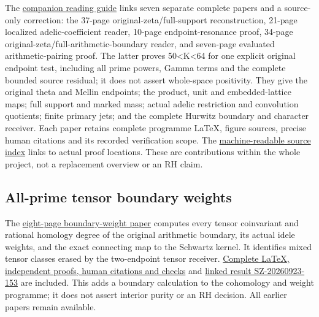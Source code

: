 \documentclass[
]{article}
\begin{document}
The
\href{https://github.com/KokunoYumeto/zeta-function-research-reader/blob/main/workbenches/splitzero-tandem/continuations/20260923-retained-source-readers/README.md}{companion
reading guide} links seven separate complete papers and a source-only
correction: the 37-page original-zeta/full-support reconstruction,
21-page localized adelic-coefficient reader, 10-page endpoint-resonance
proof, 34-page original-zeta/full-arithmetic-boundary reader, and
seven-page evaluated arithmetic-pairing proof. The latter proves
50\textless K\textless64 for one explicit original endpoint test,
including all prime powers, Gamma terms and the complete bounded source
residual; it does not assert whole-space positivity. They give the
original theta and Mellin endpoints; the product, unit and
embedded-lattice maps; full support and marked mass; actual adelic
restriction and convolution quotients; finite primary jets; and the
complete Hurwitz boundary and character receiver. Each paper retains
complete programme LaTeX, figure sources, precise human citations and
its recorded verification scope. The
\href{https://github.com/KokunoYumeto/zeta-function-research-reader/blob/main/workbenches/splitzero-tandem/continuations/20260923-retained-source-readers/PUBLIC_SOURCE_INDEX.json}{machine-readable
source index} links to actual proof locations. These are contributions
within the whole project, not a replacement overview or an RH claim.

\subsection{All-prime tensor boundary
weights}\label{all-prime-tensor-boundary-weights}

The
\href{https://github.com/KokunoYumeto/zeta-function-research-reader/blob/main/workbenches/splitzero-tandem/continuations/20260923-retained-source-readers/all-prime-boundary-weights/ROOT_BOUNDARY_WEIGHT_HOMOLOGY.pdf}{eight-page
boundary-weight paper} computes every tensor coinvariant and rational
homology degree of the original arithmetic boundary, its actual idele
weights, and the exact connecting map to the Schwartz kernel. It
identifies mixed tensor classes erased by the two-endpoint tensor
receiver.
\href{https://github.com/KokunoYumeto/zeta-function-research-reader/blob/main/workbenches/splitzero-tandem/continuations/20260923-retained-source-readers/all-prime-boundary-weights/README.md}{Complete
LaTeX, independent proofs, human citations and checks} and
\href{https://github.com/KokunoYumeto/zeta-function-research-reader/blob/main/workbenches/splitzero-tandem/continuations/20260923-retained-source-readers/all-prime-boundary-weights/RESULT_INDEX.json}{linked
result SZ-20260923-153} are included. This adds a boundary calculation
to the cohomology and weight programme; it does not assert interior
purity or an RH decision. All earlier papers remain available.
\end{document}
